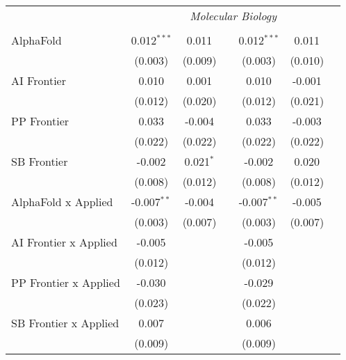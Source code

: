\begin{tabular}{lcccccc}
 & \multicolumn{6}{c}{\textit{Molecular Biology}} \\ \\
   AlphaFold                    & 0.012$^{***}$ & 0.011       &                & 0.012$^{***}$ & 0.011   &   \\   
                                & (0.003)       & (0.009)     &                & (0.003)       & (0.010) &   \\   
   AI Frontier                  & 0.010         & 0.001       &                & 0.010         & -0.001  &   \\   
                                & (0.012)       & (0.020)     &                & (0.012)       & (0.021) &   \\   
   PP Frontier                  & 0.033         & -0.004      &                & 0.033         & -0.003  &   \\   
                                & (0.022)       & (0.022)     &                & (0.022)       & (0.022) &   \\   
   SB Frontier                  & -0.002        & 0.021$^{*}$ &                & -0.002        & 0.020   &   \\   
                                & (0.008)       & (0.012)     &                & (0.008)       & (0.012) &   \\   
   AlphaFold x Applied          & -0.007$^{**}$ & -0.004      &                & -0.007$^{**}$ & -0.005  &   \\   
                                & (0.003)       & (0.007)     &                & (0.003)       & (0.007) &   \\   
   AI Frontier x Applied        & -0.005        &             &                & -0.005        &         &   \\   
                                & (0.012)       &             &                & (0.012)       &         &   \\   
   PP Frontier x Applied        & -0.030        &             &                & -0.029        &         &   \\   
                                & (0.023)       &             &                & (0.022)       &         &   \\   
   SB Frontier x Applied        & 0.007         &             &                & 0.006         &         &   \\   
                                & (0.009)       &             &                & (0.009)       &         &   \\   

\end{tabular}
